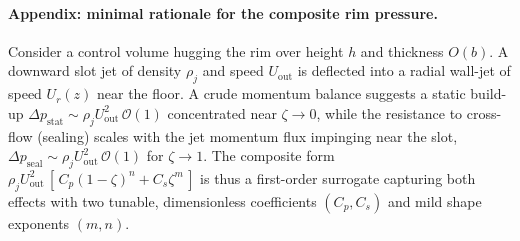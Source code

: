 \documentclass[11pt,a4paper]{article}
\begin{document}
\paragraph{Appendix: minimal rationale for the composite rim pressure.}
Consider a control volume hugging the rim over height $h$ and thickness $O(b)$.
A downward slot jet of density $\rho_j$ and speed $U_{\mathrm{out}}$ is deflected
into a radial wall-jet of speed $U_r(z)$ near the floor. A crude momentum balance
suggests a static build-up $\Delta p_{\mathrm{stat}}\sim \rho_j U_{\mathrm{out}}^2
\,\mathcal{O}(1)$ concentrated near $\zeta\!\to\!0$, while the resistance to
cross-flow (sealing) scales with the jet momentum flux impinging near the slot,
$\Delta p_{\mathrm{seal}}\sim \rho_j U_{\mathrm{out}}^2\,\mathcal{O}(1)$ for
$\zeta\!\to\!1$. The composite form
$\rho_j U_{\mathrm{out}}^2\,[\,C_p(1-\zeta)^n + C_s \zeta^m\,]$ is thus a
first-order surrogate capturing both effects with two tunable, dimensionless
coefficients $(C_p,C_s)$ and mild shape exponents $(m,n)$.
\end{document}
